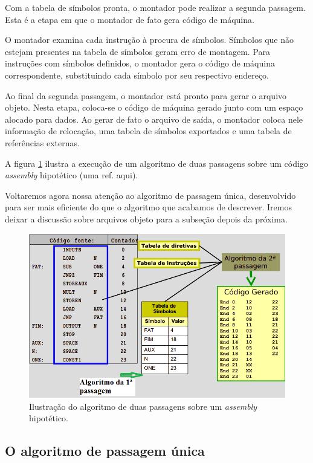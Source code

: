 Com a tabela de símbolos pronta, o montador pode realizar a segunda passagem. Esta é a etapa em que o montador de fato gera código de máquina. 

O montador examina cada instrução à procura de símbolos. Símbolos que não estejam presentes na tabela de símbolos geram erro de montagem. Para instruções com símbolos definidos, o montador gera o código de máquina correspondente, substituindo cada símbolo por seu respectivo endereço.

Ao final da segunda passagem, o montador está pronto para gerar o arquivo objeto. Nesta etapa, coloca-se o código de máquina gerado junto com um espaço alocado para dados. Ao gerar de fato o arquivo de saída, o montador coloca nele informação de relocação, uma tabela de símbolos exportados e uma tabela de referências externas.

A figura \ref{duas_passagens} ilustra a execução de um algoritmo de duas passagens sobre um código \textit{assembly} hipotético (uma ref. aqui).

Voltaremos agora nossa atenção ao algoritmo de passagem única, desenvolvido para ser mais eficiente do que o algoritmo que acabamos de descrever. Iremos deixar a discussão sobre arquivos objeto para a subseção depois da próxima.

\begin{figure}[ptb]
  \begin{center}
    \includegraphics[scale=.7]{imagens/duas_passagens}
  \end{center}
  \caption{Ilustração do algoritmo de duas passagens sobre um \textit{assembly} hipotético.}
  \label{duas_passagens}
\end{figure}

\subsection{O algoritmo de passagem única}

